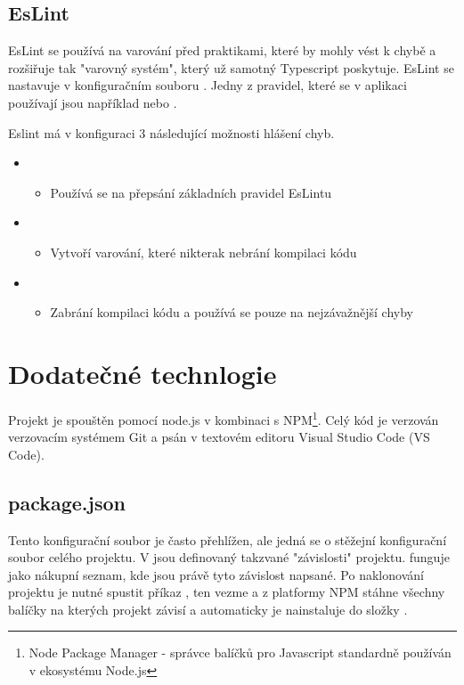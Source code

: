 \subsection{EsLint}
EsLint se používá na varování před praktikami, které by mohly vést k chybě a rozšiřuje tak "varovný systém", který už samotný Typescript poskytuje.
EsLint se nastavuje v konfiguračním souboru . Jedny z pravidel, které se v aplikaci používají jsou například  nebo .

Eslint má v konfiguraci 3 následující možnosti hlášení chyb\cite{eslint}.
\begin{itemize}
    \item {}
    \begin{itemize}
         \item Používá se na přepsání základních pravidel EsLintu
    \end{itemize}
    \item {}
    \begin{itemize}
        \item Vytvoří varování, které nikterak nebrání kompilaci kódu
    \end{itemize}
    \item {}
    \begin{itemize}
        \item Zabrání kompilaci kódu a používá se pouze na nejzávažnější chyby
    \end{itemize}
\end{itemize}


\section{Dodatečné technlogie}
Projekt je spouštěn pomocí node.js v kombinaci s NPM\footnote{Node Package Manager - správce balíčků pro Javascript standardně používán v ekosystému Node.js}. Celý kód je verzován verzovacím systémem Git a psán v textovém editoru Visual Studio Code (VS Code).
\subsection{package.json}
Tento konfigurační soubor je často přehlížen, ale jedná se o stěžejní konfigurační soubor celého projektu. V  jsou definovaný takzvané "závislosti" projektu. funguje jako nákupní seznam, kde jsou právě tyto závislost napsané. Po naklonování projektu je nutné spustit příkaz , ten vezme  a z platformy NPM\cite{npm} stáhne všechny balíčky na kterých projekt závisí a automaticky je nainstaluje do složky .

